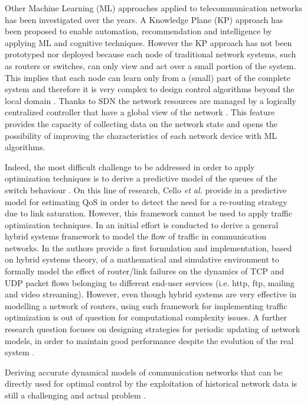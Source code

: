 Other Machine Learning (ML) approaches applied to telecommunication networks has been investigated over the years. A Knowledge Plane (KP) approach \cite{Clark2003} has been proposed to enable automation, recommendation and intelligence by applying ML and cognitive techniques. However the KP approach has not been prototyped nor deployed because each node of traditional network systems, such as routers or switches, can only view and act over a small portion of the system. This implies that each node can learn only from a (small) part of the complete system and therefore it is very complex to design control algorithms beyond the local domain \cite{Mestres2017}. Thanks to SDN the network resources are managed by a logically centralized controller that have a global view of the network \cite{Kreutz2015, Sezer2013, Chen2015, Jarschel2014, Ameigeiras2015}. This feature provides the capacity of collecting data on the network state and opens the possibility of improving the characteristics of each network device with ML algorithms.

Indeed, the most difficult challenge to be addressed in order to apply optimization techniques is to derive a predictive model of the queues of the switch behaviour \cite{Yeremenko2018, John2017, Yang2011, Bahnasy2018, Zhang2014}. On this line of research, Cello \textit{et al.} provide in \cite{Cello2016} a predictive model for estimating QoS in order to detect the need for a re-routing strategy due to link saturation. However, this framework cannot be used to apply traffic optimization techniques. In \cite{LeeIEEEToN2007} an initial effort is conducted to derive a general hybrid systems framework to model the flow of traffic in communication networks. In \cite{DiBenedetto2014} the authors provide a first formulation and implementation, based on hybrid systems theory, of a mathematical and simulative environment to formally model the effect of router/link failures on the dynamics of TCP and UDP packet flows belonging to different end-user services (i.e. http, ftp, mailing and video streaming). However, even though hybrid systems are very effective in modelling a network of routers, using such framework for implementing traffic optimization is out of question for computational complexity issues. A further research question focuses on designing strategies for periodic updating of network models, in order to maintain good performance despite the evolution of the real system \cite{Mulinka2018}.

Deriving accurate dynamical models of communication networks that can be directly used for optimal control by the exploitation of historical network data is still a challenging and actual problem \cite{Kim2019,Aljoby2019,Lebedenko2018,Le2007,SouravGhosh2005}.

